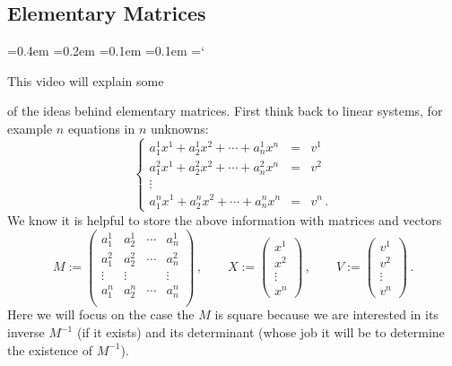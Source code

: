 
\subsection*{Elementary Matrices}

{\ttfamily
{}\font=0.4em
\font=0.2em
\font=0.1em
\font=0.1em
\hyphenchar\font=`\-


\hypertarget{scripts_elementary_matrices_explanation}{This video will explain some} 
of the ideas behind elementary matrices. First think back to linear systems, for example
$n$ equations in $n$ unknowns:
\[
\left\{
\begin{array}{ccc}
a^1_1 x^1 + a^1_2 x^2+\cdots +a^1_n x^n &=&v^1\\[1mm]
a^2_1 x^1 + a^2_2 x^2+\cdots +a^2_n x^n &=&v^2\\[1mm]
\vdots &&\\[2mm]
a^n_1 x^1 + a^n_2 x^2+\cdots +a^n_n x^n &=&v^n\, .
\end{array}\right .
\]
We know it is helpful to store the above information with matrices and vectors
\[
M:=\begin{pmatrix}
a^1_1&a^1_2&\cdots& a^1_n\\
a^2_1&a^2_2&\cdots& a^2_n\\
\vdots&\vdots&&\vdots\\
a^n_1&a^n_2&\cdots& a^n_n\\
\end{pmatrix}\, ,\qquad
X:=\begin{pmatrix}x^1\\x^2\\\vdots\\ x^n\end{pmatrix}\, ,\qquad
V:=\begin{pmatrix}v^1\\v^2\\\vdots\\v^n\end{pmatrix}\, .
\]
Here we will focus on the case the $M$ is square because we are interested in its inverse $M^{-1}$ (if it exists) and its determinant (whose job it will be to determine the existence of $M^{-1}$).

}
